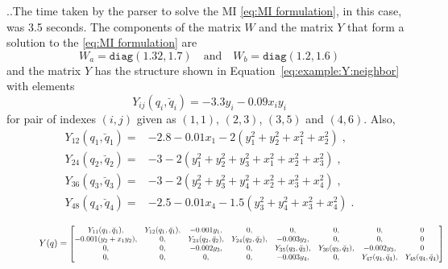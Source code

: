 \documentclass[10pt,twocolumn,twoside]{IEEEtran}
\newcounter{para}
\newcommand\mypara{\par \thesection.\refstepcounter{para}\thepara.\space}
\theoremstyle{plain}
\theoremstyle{definition}
\theoremstyle{remark}
\begin{document}
\mypara The time taken by the parser to solve the MI \eqref{eq:MI formulation}, in this case, was 3.5 seconds. The components of the matrix $W$ and the matrix $Y$ that form a solution to the \eqref{eq:MI formulation} are
\begin{equation*}
		W_a=\mathbin{\mathtt{diag}}\left(
 1.32,1.7\right)\quad\text{and}\quad W_b=\mathbin{\mathtt{diag}}\left(1.2,1.6\right)
\end{equation*}
and the matrix $Y$ has the structure shown in Equation~\eqref{eq:example:Y:neighbor} with elements
\begin{equation*}
	Y_{ij}(q_i,\breve{q}_i)=-3.3y_i-0.09x_iy_i
\end{equation*}
for pair of indexes $(i,j)$ given as $(1,1)$, $(2,3)$, $(3,5)$ and $(4,6)$. Also, 
\begin{align*}
	Y_{12}(q_1,\breve{q}_1)=&-2.8-0.01x_1-2(y_1^2+y_2^2+x_1^2+x_2^2)\;,\\	
	Y_{24}(q_2,\breve{q}_2)=&-3-2(y_1^2+y_2^2+y_3^2+x_1^2+x_2^2+x_3^2)\;,\\	
	Y_{36}(q_3,\breve{q}_3)=&-3-2(y_2^2+y_3^2+y_4^2+x_2^2+x_3^2+x_4^2)\;,\\	
	Y_{48}(q_4,\breve{q}_4)=&-2.5-0.01x_4-1.5(y_3^2+y_4^2+x_3^2+x_4^2)\;.
\end{align*}

\begin{figure}
\begin{equation}\label{eq:example:Y:neighbor}
	Y(q)=\scalebox{0.85}{$\begin{bmatrix}
	Y_{11}(q_1,\breve{q}_1),&Y_{12}(q_1,\breve{q}_1),&-0.001y_1,&0,&0,&0,&0,&0\\
	-0.001(y_2+x_1y_2),&0,&Y_{23}(q_2,\breve{q}_2),&Y_{24}(q_2,\breve{q}_2),&-0.003y_2,&0,&0,&0\\
	0,&0,&-0.002y_3,&0,&Y_{35}(q_3,\breve{q}_3),&Y_{36}(q_3,\breve{q}_3),&-0.002y_3,&0\\
	0,&0,&0,&0,&-0.003y_4,&0,&Y_{47}(q_4,\breve{q}_4),&Y_{48}(q_4,\breve{q}_4)
	\end{bmatrix}$}
\end{equation}
\end{figure}
 
\end{document}
